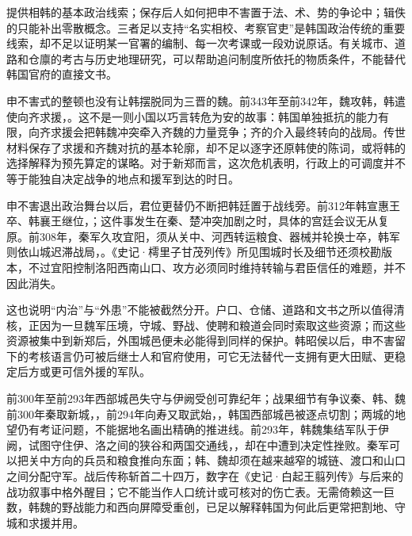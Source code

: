 \begin{sourcenote}
提供相韩的基本政治线索；保存后人如何把申不害置于法、术、势的争论中；辑佚的只能补出零散概念。三者足以支持“名实相校、考察官吏”是韩国政治传统的重要线索，却不足以证明某一官署的编制、每一次考课或一段劝说原话。有关城市、道路和仓廪的考古与历史地理研究，可以帮助追问制度所依托的物质条件，不能替代韩国官府的直接文书。
\end{sourcenote}

申不害式的整顿也没有让韩摆脱同为三晋的魏。前343年至前342年，魏攻韩，韩遣使向齐求援，。这不是一则小国以巧言转危为安的故事：韩国单独抵抗的能力有限，向齐求援会把韩魏冲突牵入齐魏的力量竞争；齐的介入最终转向的战局。传世材料保存了求援和齐魏对抗的基本轮廓，却不足以逐字还原韩使的陈词，或将韩的选择解释为预先算定的谋略。对于新郑而言，这次危机表明，行政上的可调度并不等于能独自决定战争的地点和援军到达的时日。

申不害退出政治舞台以后，君位更替仍不断把韩廷置于战线旁。前312年韩宣惠王卒、韩襄王继位，；这件事发生在秦、楚冲突加剧之时，具体的宫廷会议无从复原。前308年，秦军久攻宜阳，须从关中、河西转运粮食、器械并轮换士卒，韩军则依山城迟滞战局，。《史记·樗里子甘茂列传》所见围城时长及细节还须校勘版本，不过宜阳控制洛阳西南山口、攻方必须同时维持转输与君臣信任的难题，并不因此消失。

这也说明“内治”与“外患”不能被截然分开。户口、仓储、道路和文书之所以值得清核，正因为一旦魏军压境，守城、野战、使聘和粮道会同时索取这些资源；而这些资源被集中到新郑后，外围城邑便未必能得到同样的保护。韩昭侯以后，申不害留下的考核语言仍可被后继士人和官府使用，可它无法替代一支拥有更大田赋、更稳定后方或更可信外援的军队。

\begin{event}{前300年至前293年}{西部城邑失守与伊阙受创}{可靠纪年；战果细节有争议}{秦、韩、魏}
前300年秦取新城，，前294年向寿又取武始，，韩国西部城邑被逐点切割；两城的地望仍有考证问题，不能据地名画出精确的推进线。前293年，韩魏集结军队于伊阙，试图守住伊、洛之间的狭谷和两国交通线，，却在中遭到决定性挫败。秦军可以把关中方向的兵员和粮食推向东面；韩、魏却须在越来越窄的城链、渡口和山口之间分配守军。战后传称斩首二十四万，数字在《史记·白起王翦列传》与后来的战功叙事中格外醒目；它不能当作人口统计或可核对的伤亡表。无需倚赖这一巨数，韩魏的野战能力和西向屏障受重创，已足以解释韩国为何此后更常把割地、守城和求援并用。
\end{event}


